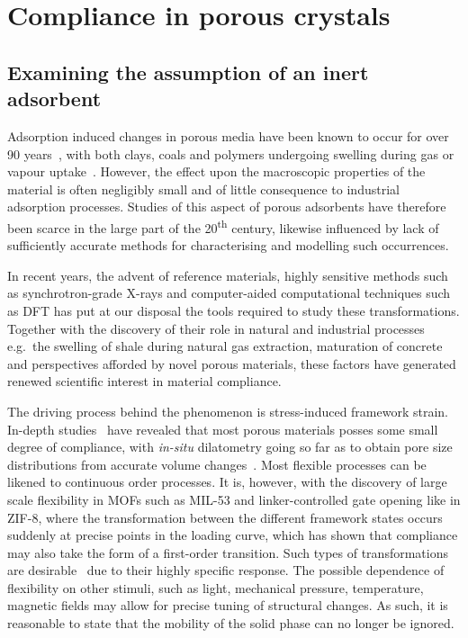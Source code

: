 
\section{Compliance in porous crystals}

\subsection{Examining the assumption of an inert adsorbent}

Adsorption induced changes in porous media have been known
to occur for over 90 years~\cite{mcbainNatureInfluenceHumidity1927},
with both clays, coals and polymers undergoing swelling during gas
or vapour uptake~\cite{gorAdsorptioninducedDeformationNanoporous2017}.
However, the effect upon the macroscopic properties of the material is 
often negligibly small and of little consequence to industrial adsorption
processes. Studies of this aspect of porous adsorbents have therefore
been scarce in the large part of the 20\textsuperscript{th} century,
likewise influenced by lack of sufficiently accurate methods for 
characterising and modelling such occurrences.

In recent years, the advent of reference materials, 
highly sensitive methods such as synchrotron-grade X-rays and computer-aided
computational techniques such as DFT has put at our disposal the tools 
required to study these transformations. 
Together with the discovery of their role in natural and industrial 
processes e.g.\ the swelling of shale during natural gas extraction,
maturation of concrete and perspectives afforded by novel porous materials,
these factors have generated renewed scientific interest in material
compliance.

The driving process behind the phenomenon is stress-induced framework 
strain. In-depth studies~\cite{beringAlterationZeoliteGranule1977} 
have revealed that most porous materials posses some small
degree of compliance, with \textit{in-situ} dilatometry going so far as to 
obtain pore size distributions from accurate volume
changes~\cite{reichenauerExtractingPoreSize2001}. Most flexible 
processes can be likened to continuous order processes. It is, however,
with the discovery of large scale flexibility in MOFs such as 
MIL-53 and linker-controlled gate opening like in ZIF-8, 
where the transformation between the different framework 
states occurs suddenly at precise points in the loading curve,
which has shown that compliance may also take the form of 
a first-order transition. Such types of transformations are
desirable~\cite{kitagawaFunctionalPorousCoordination2004} due to 
their highly specific response. The possible dependence 
of flexibility on other stimuli, such as light, mechanical pressure,
temperature, magnetic fields may allow for precise tuning of 
structural changes. As such, it is reasonable to state that
the mobility of the solid phase can no longer be ignored.

